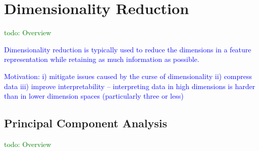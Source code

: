 \section{Dimensionality Reduction}

\textcolor{green}{todo: Overview}

\textcolor{blue}{Dimensionality reduction is typically used to reduce the dimensions in a feature representation while retaining as much information as possible.}

\textcolor{blue}{Motivation: i) mitigate issues caused by the curse of dimensionality ii) compress data iii) improve interpretability -- interpreting data in high dimensions is harder than in lower dimension spaces (particularly three or less) }

\subsection{Principal Component Analysis}

\textcolor{green}{todo: Overview}